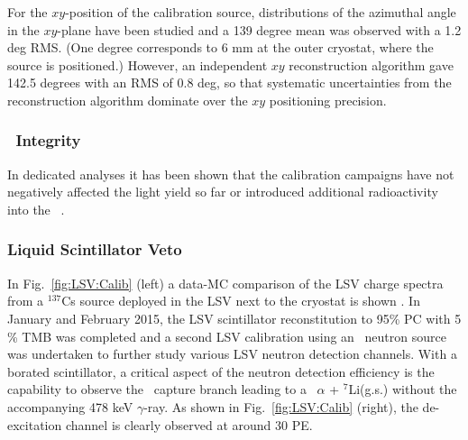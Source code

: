 For the $xy$-position of the calibration source, distributions of the azimuthal angle in the $xy$-plane have been studied and a 139 degree mean was observed with a 1.2 deg RMS. (One degree corresponds to 6 mm at the outer cryostat, where the source is positioned.) However, an independent $xy$ reconstruction algorithm gave 142.5 degrees with an RMS of 0.8 deg, so that systematic uncertainties from the reconstruction algorithm dominate over the $xy$ positioning precision. %


\subsubsection{\lsv\ Integrity}
In dedicated analyses it has been shown that the calibration campaigns have not negatively affected the light yield so far or introduced additional radioactivity into the \lsv\ \cite{Agnes:2015qyz}.

\subsubsection{Liquid Scintillator Veto}\label{sec:LSV:gammasources}
In Fig.~\ref{fig:LSV:Calib} (left) a data-MC comparison of the LSV charge spectra from a $^{137}$Cs source deployed in the LSV next to the cryostat is shown \cite{DS50:G4DS:paper}.
In January and February 2015, the LSV scintillator reconstitution to 95\% PC with 5 \% TMB was completed and a second LSV calibration using an \AmBe\ neutron source was undertaken to further study various LSV neutron detection channels. With a borated scintillator, a critical aspect of the neutron detection efficiency is the capability to observe the \brbortenground\ capture branch leading to a \enbortengroundalpha\ $\alpha$ + $^7$Li(g.s.) without the accompanying 478 keV $\gamma$-ray. As shown in Fig.~\ref{fig:LSV:Calib} (right), the de-excitation channel is clearly observed at around 30 PE.

